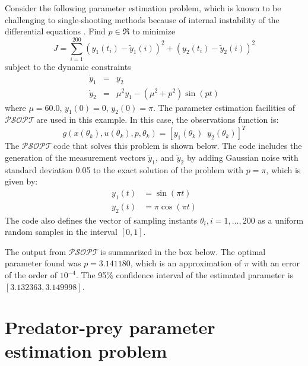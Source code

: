 \documentclass[a4paper,11pt]{report}    %
\newcommand{\psopt}{$\mathcal{PSOPT}$\,}  %
\newenvironment{shadedframe}{%
  \def\FrameCommand{\fcolorbox{black}{shadecolor}}%
  \MakeFramed {\FrameRestore}}
{\endMakeFramed}
\begin{document}
Consider the following parameter estimation problem, which is known to be challenging to
single-shooting methods because of internal instability of the differential equations
 \cite{Schittkowski:02}.  Find $p\in \Re$ to minimize 
\begin{equation}
  J = \sum\limits_{i=1}^{200} (y_1(t_i) - \tilde {y}_{1}(i) )^2 + (y_2(t_i) - \tilde{y}_{2}(i) )^2
\end{equation}
subject to the dynamic constraints
\begin{equation}
  \begin{array}{lcl}
    \dot y_1 & = & y_2 \\
    \dot y_2 & = & \mu^2 y_1 - (\mu^2+p^2)\sin(p t)
  \end{array}
\end{equation}
where $\mu=60.0$, $y_1(0)=0$, $y_2(0)=\pi$.
The parameter estimation facilities of \psopt are 
used in this example. In this case, the observations function is:
\[
    g( x(\theta_k), u(\theta_k), p, \theta_k ) = \left[ y_1(\theta_k)\,\,\,y_2(\theta_k)\right]^T
\]
The
\psopt code that solves this problem is shown below. The code includes
the generation of the measurement vectors $\tilde{y}_{1}$, and $\tilde{y}_{2}$ by adding Gaussian noise with standard deviation 0.05
to the exact solution of the problem with $p=\pi$, which is given by:
\[
 \begin{aligned}
y_1(t)&= \sin(\pi t)\\ y_2(t)&=\pi \cos(\pi t)  
 \end{aligned}
\]
The code also defines 
 the vector of sampling instants $\theta_i, i=1,\ldots,200$ as a uniform random 
samples in the interval $[0,1]$. 

\tiny
\begin{shadedframe}

\end{shadedframe}
\normalsize

The output from \psopt is summarized in the box below. The optimal parameter found was $p=3.141180$, which is
an approximation of $\pi$ with an error of the order of $10^{-4}$. The 95\% confidence interval of the estimated
parameter is $[3.132363,	3.149998]$.

\begin{shadedframe}

\end{shadedframe}


\section{Predator-prey parameter estimation problem}
\end{document}
